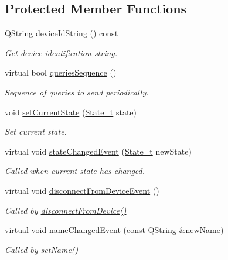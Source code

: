 \subsection*{Protected Member Functions}
\begin{DoxyCompactItemize}
\item 
Q\-String \hyperlink{classmdt_device_add9f8ec2f944b5c5f92a97424a194177}{device\-Id\-String} () const 
\begin{DoxyCompactList}\small\item\em Get device identification string. \end{DoxyCompactList}\item 
virtual bool \hyperlink{classmdt_device_acba50968d201ad95c4eaa2ab2ed48b4f}{queries\-Sequence} ()
\begin{DoxyCompactList}\small\item\em Sequence of queries to send periodically. \end{DoxyCompactList}\item 
void \hyperlink{classmdt_device_ad2025928441ddca71523ed52a02e89e4}{set\-Current\-State} (\hyperlink{classmdt_device_a8bcf508fbd38a8f0b235e8a9b00319f6}{State\-\_\-t} state)
\begin{DoxyCompactList}\small\item\em Set current state. \end{DoxyCompactList}\item 
virtual void \hyperlink{classmdt_device_ad2646ad2fb99b40c9f303b24a7ee971e}{state\-Changed\-Event} (\hyperlink{classmdt_device_a8bcf508fbd38a8f0b235e8a9b00319f6}{State\-\_\-t} new\-State)
\begin{DoxyCompactList}\small\item\em Called when current state has changed. \end{DoxyCompactList}\item 
virtual void \hyperlink{classmdt_device_afe3dec5b38bb5db7f5f6f250caa5f577}{disconnect\-From\-Device\-Event} ()
\begin{DoxyCompactList}\small\item\em Called by \hyperlink{classmdt_device_a2b694a37d9464d27214bdeceec220998}{disconnect\-From\-Device()} \end{DoxyCompactList}\item 
virtual void \hyperlink{classmdt_device_a30b8db129316183a10d38a569d431c92}{name\-Changed\-Event} (const Q\-String \&new\-Name)
\begin{DoxyCompactList}\small\item\em Called by \hyperlink{classmdt_device_a80186f1aa6fbdc13f1652de978c35518}{set\-Name()} \end{DoxyCompactList}\end{DoxyCompactItemize}
